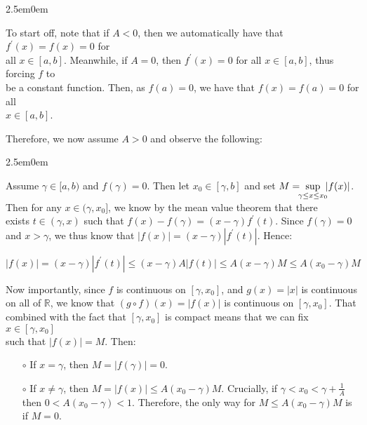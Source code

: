 \documentclass{book}
\newcommand{\pracTwo}{
   \color{Orange}%
   \fontsize{12}{14}\selectfont%
}
\newenvironment{myIndent}{%
   \begin{adjustwidth}{2.5em}{0em}%
}{%
   \end{adjustwidth}%
}
\newcommand{\retTwo}{\hfill\bigbreak}
\begin{document}
{\begin{myIndent}\pracTwo
   To start off, note that if $A < 0$, then we automatically have that $f^\prime(x) = f(x) = 0$ for\\ all $x \in [a, b]$. Meanwhile, if $A = 0$, then $f^\prime(x) = 0$ for all $x \in [a, b]$, thus forcing $f$ to\\ be a constant function. Then, as $f(a) = 0$, we have that $f(x) = f(a) = 0$ for all\\ $x \in [a, b]$. \retTwo

   Therefore, we now assume $A > 0$ and observe the following:
   \begin{myIndent}
      Assume $\gamma \in [a, b)$ and $f(\gamma) = 0$. Then let $x_0 \in [\gamma, b]$ and set $M = \hspace{-0.45em}\sup\limits_{\gamma\leq x\leq x_0}\hspace{-0.4em}|f(x)|$.\\ 

      Then for any $x \in (\gamma, x_0]$, we know by the mean value theorem that there\\ exists $t \in (\gamma, x)$ such that $f(x) - f(\gamma) = (x-\gamma)f^\prime(t)$. Since $f(\gamma) = 0$\\ and $x > \gamma$, we thus know that $|f(x)| = (x - \gamma)|f^\prime(t)|$. Hence:

      {\center $|f(x)| = (x - \gamma)|f^\prime(t)| \leq (x - \gamma)A|f(t)| \leq A(x - \gamma)M \leq A(x_0 - \gamma)M$ \retTwo\par}

      Now importantly, since $f$ is continuous on $[\gamma, x_0]$, and $g(x) = |x|$ is continuous\\ on all of $\mathbb{R}$, we know that $(g\circ f)(x) = |f(x)|$ is continuous on $[\gamma, x_0]$. That\\ combined with the fact that $[\gamma, x_0]$ is compact means that we can fix $x \in [\gamma, x_0]$\\ such that $|f(x)| = M$. Then:
      \begin{itemize}
         \item[$\circ$] If $x = \gamma$, then $M = |f(\gamma)| = 0$.
         
         \newpage

         \item[$\circ$] If $x \neq \gamma$, then $M = |f(x)| \leq A(x_0 - \gamma)M$. Crucially, if $\gamma < x_0 < \gamma + \frac{1}{A}$\\ [1pt] then $0 < A(x_0 - \gamma) < 1$. Therefore, the only way for $M \leq A(x_0 - \gamma)M$ is\\ [2pt] if $M = 0$.\retTwo
      \end{itemize}


\end{myIndent}
\end{myIndent}}
\end{document}
